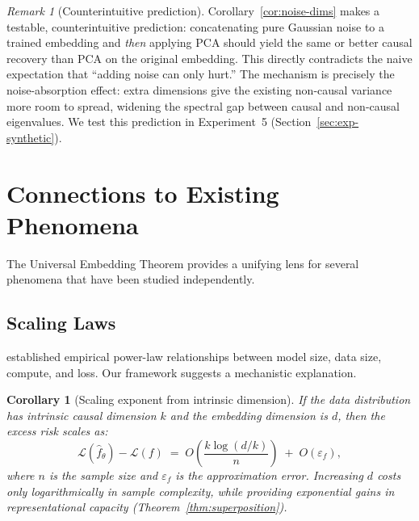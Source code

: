 \documentclass[11pt,a4paper]{article}
\theoremstyle{plain}
\newtheorem{corollary}[theorem]{Corollary}
\theoremstyle{definition}
\theoremstyle{remark}
\newtheorem{remark}[theorem]{Remark}
\newcommand{\cL}{\mathcal{L}}
\begin{document}
\begin{remark}[Counterintuitive prediction]
Corollary~\ref{cor:noise-dims} makes a testable, counterintuitive prediction:
concatenating pure Gaussian noise to a trained embedding and \emph{then}
applying PCA should yield the same or better causal recovery than PCA on the
original embedding.  This directly contradicts the naive expectation that
``adding noise can only hurt.''  The mechanism is precisely the noise-absorption
effect: extra dimensions give the existing non-causal variance more room to
spread, widening the spectral gap between causal and non-causal eigenvalues.
We test this prediction in Experiment~5 (Section~\ref{sec:exp-synthetic}).
\end{remark}


\section{Connections to Existing Phenomena}\label{sec:connections}

The Universal Embedding Theorem provides a unifying lens for several phenomena
that have been studied independently.

\subsection{Scaling Laws}\label{sec:scaling-laws}

\citet{kaplan2020scaling} established empirical power-law relationships between
model size, data size, compute, and loss.  Our framework suggests a mechanistic
explanation.

\begin{corollary}[Scaling exponent from intrinsic dimension]%
\label{cor:scaling}
If the data distribution has intrinsic causal dimension $k$ and the embedding
dimension is $d$, then the excess risk scales as:
\begin{equation}\label{eq:scaling}
  \cL(\hat{f}_\theta) - \cL(f)
  \;=\; O\!\left(\frac{k\log(d/k)}{n}\right)
  \;+\; O(\varepsilon_f),
\end{equation}
where $n$ is the sample size and $\varepsilon_f$ is the approximation error.
Increasing $d$ costs only logarithmically in sample complexity, while providing
exponential gains in representational capacity
(Theorem~\ref{thm:superposition}).
\end{corollary}
\end{document}
